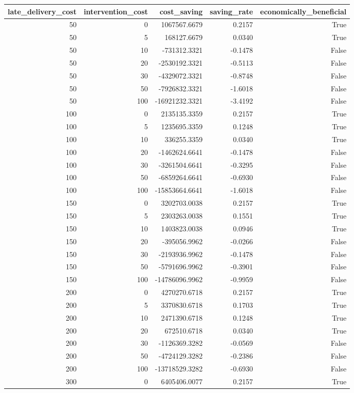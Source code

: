 \begin{tabular}{rrrrr}
\toprule
late_delivery_cost & intervention_cost & cost_saving & saving_rate & economically_beneficial \\
\midrule
50 & 0 & 1067567.6679 & 0.2157 & True \\
50 & 5 & 168127.6679 & 0.0340 & True \\
50 & 10 & -731312.3321 & -0.1478 & False \\
50 & 20 & -2530192.3321 & -0.5113 & False \\
50 & 30 & -4329072.3321 & -0.8748 & False \\
50 & 50 & -7926832.3321 & -1.6018 & False \\
50 & 100 & -16921232.3321 & -3.4192 & False \\
100 & 0 & 2135135.3359 & 0.2157 & True \\
100 & 5 & 1235695.3359 & 0.1248 & True \\
100 & 10 & 336255.3359 & 0.0340 & True \\
100 & 20 & -1462624.6641 & -0.1478 & False \\
100 & 30 & -3261504.6641 & -0.3295 & False \\
100 & 50 & -6859264.6641 & -0.6930 & False \\
100 & 100 & -15853664.6641 & -1.6018 & False \\
150 & 0 & 3202703.0038 & 0.2157 & True \\
150 & 5 & 2303263.0038 & 0.1551 & True \\
150 & 10 & 1403823.0038 & 0.0946 & True \\
150 & 20 & -395056.9962 & -0.0266 & False \\
150 & 30 & -2193936.9962 & -0.1478 & False \\
150 & 50 & -5791696.9962 & -0.3901 & False \\
150 & 100 & -14786096.9962 & -0.9959 & False \\
200 & 0 & 4270270.6718 & 0.2157 & True \\
200 & 5 & 3370830.6718 & 0.1703 & True \\
200 & 10 & 2471390.6718 & 0.1248 & True \\
200 & 20 & 672510.6718 & 0.0340 & True \\
200 & 30 & -1126369.3282 & -0.0569 & False \\
200 & 50 & -4724129.3282 & -0.2386 & False \\
200 & 100 & -13718529.3282 & -0.6930 & False \\
300 & 0 & 6405406.0077 & 0.2157 & True \\

\end{tabular}
